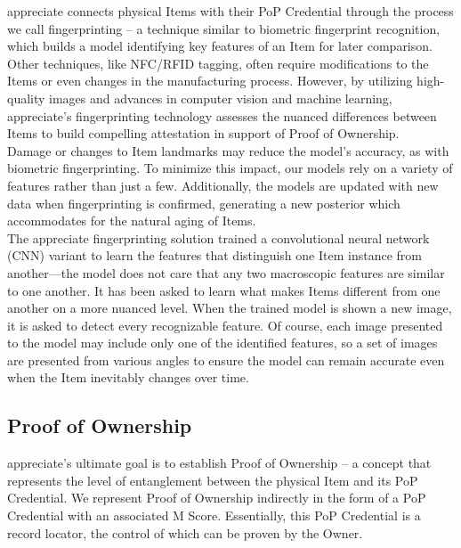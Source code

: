 \documentclass[a4paper,onecolumn, 10.5pt]{article}
\begin{document}
\begin{tcolorbox}[colback=gray!5!white,colframe=gray!50!black, title=M score components: item fingerprinting]

appreciate connects physical Items with their PoP Credential through the process we call fingerprinting – a technique similar to biometric fingerprint recognition, which builds a model identifying key features of an Item for later comparison. Other techniques, like NFC/RFID tagging, often require modifications to the Items or even changes in the manufacturing process. However, by utilizing high-quality images and advances in computer vision and machine learning, appreciate’s fingerprinting technology assesses the nuanced differences between Items to build compelling attestation in support of Proof of Ownership.\\
\newline
Damage or changes to Item landmarks may reduce the model’s accuracy, as with biometric fingerprinting. To minimize this impact, our models rely on a variety of features rather than just a few. Additionally, the models are updated with new data when fingerprinting is confirmed, generating a new posterior which accommodates for the natural aging of Items.\\
\newline
The appreciate fingerprinting solution trained a convolutional neural network (CNN) variant to learn the features that distinguish one Item instance from another—the model does not care that any two macroscopic features are similar to one another. It has been asked to learn what makes Items different from one another on a more nuanced level. When the trained model is shown a new image, it is asked to detect every recognizable feature. Of course, each image presented to the model may include only one of the identified features, so a set of images are presented from various angles to ensure the model can remain accurate even when the Item inevitably changes over time.
\end{tcolorbox}


\subsection {Proof of Ownership}

appreciate’s ultimate goal is to establish Proof of Ownership -- a concept that represents the level of entanglement between the physical Item and its PoP Credential.  We represent Proof of Ownership indirectly in the form of a PoP Credential with an associated M Score. Essentially, this PoP Credential is a record locator, the control of which can be proven by the Owner.
\end{document}
